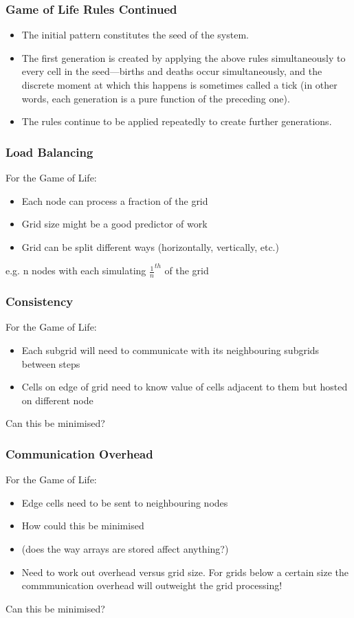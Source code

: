 \documentclass{beamer}
\begin{document}
         \begin{frame}
         	\frametitle{Game of Life Rules Continued}
         	\begin{itemize}
         		\item The initial pattern constitutes the seed of the system.
         		\item The first generation is created by applying the above rules simultaneously to every cell in the seed—births and deaths occur simultaneously, and the discrete moment at which this happens is sometimes called a tick (in other words, each generation is a pure function of the preceding one).
         		\item The rules continue to be applied repeatedly to create further generations.
         	\end{itemize}
         	  
         \end{frame}       
    \begin{frame}
    	\frametitle{Load Balancing}
    	For the Game of Life:
    	\begin{itemize}
    		\item Each node can process a fraction of the grid
    		\item Grid size might be a good predictor of work
    		\item Grid can be split different ways (horizontally, vertically, etc.)
    	\end{itemize}
    	e.g. n nodes with each simulating $\frac{1}{n} ^{th}$ of the grid
    \end{frame}         	
       \begin{frame}
       	\frametitle{Consistency}
       	For the Game of Life:
       	\begin{itemize}
       		\item Each subgrid will need to communicate with its neighbouring subgrids between steps
       		\item Cells on edge of grid need to know value of cells adjacent to them but hosted on different node
       	\end{itemize}
       	Can this be minimised?
       \end{frame}      	
       \begin{frame}
       	\frametitle{Communication Overhead}
       	For the Game of Life:
       	\begin{itemize}
       		\item Edge cells need to be sent to neighbouring nodes 
       		\item How could this be minimised
       		\item (does the way arrays are stored affect anything?)
       		\item Need to work out overhead versus grid size.  For grids below a certain size the commmunication overhead will outweight the grid processing!
       	\end{itemize}
       	Can this be minimised?
       \end{frame}         	
\end{document}
